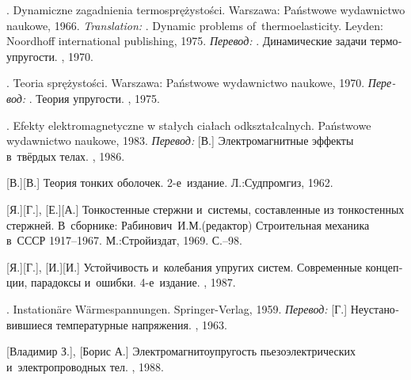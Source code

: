 \begin{thebibliography}{123}
\begin{otherlanguage}{russian}
.
Dynamiczne zagadnienia termosprężystości.
Warsza\-wa: Państwowe wydawnictwo naukowe, 1966. 
\emph{Translation:}
.
Dynamic problems of~thermoelasticity.
Leyden: Noordhoff international publishing, 1975.
\emph{Перевод:}
.
Динамические задачи термоупругости.
\mirpublisher, 1970.

.
Teoria sprężystości.
Warszawa: Państwowe wy\-daw\-nic\-two naukowe, 1970.
\emph{Перевод:}
.
Теория упругости.
\mirpublisher, 1975.

. Efekty elektromagnetyczne w stałych ciałach od\-kształ\-cal\-nych. Państwowe wydawnictwo naukowe, 1983. 
\emph{Перевод:}
[В.] Электромагнитные эффекты в~твёрдых телах. \mirpublisher, 1986. 

[В.][В.] Теория тонких оболочек. 2\hbox{-}е~издание. Л.:\;Судпромгиз, 1962. 

[Я.][Г.], [Е.][А.] Тонкостенные стержни и~системы, составленные из тонкостенных стержней. В~сборнике: Рабинович~И.\:М.\:(редактор) Строительная механика в~СССР 1917\hbox{--}1967. М.:\;Строй\-издат, 1969. С.\hbox{--}98.

[Я.][Г.], [И.][И.] Устойчивость и~колебания упругих систем. Современные концепции, парадоксы и~ошибки. 4\hbox{-}е~издание. \naukapublisher, 1987. 

. Instation\"{a}re W\"{a}rmespannungen. Springer\hbox{-}Verlag, 1959. 
\emph{Перевод:} [Г.] Неустановившиеся температурные напряжения. \fizmatgiz, 1963. 

[Владимир З.], [Борис А.] Электромагнитоупругость пьезоэлектрических и~электропроводных тел. \naukapublisher, 1988. 


\end{otherlanguage}
\end{thebibliography}
